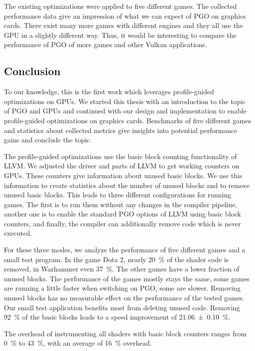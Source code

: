 The existing optimizations were applied to five different games.
The collected performance data give an impression of what we can expect of PGO on graphics cards.
There exist many more games with different engines and they all use the GPU in a slightly different way.
Thus, it would be interesting to compare the performance of PGO of more games and other Vulkan applications.

\subsection{Conclusion}
\label{sub:conclusion}
To our knowledge, this is the first work which leverages profile-guided optimizations on GPUs.
We started this thesis with an introduction to the topic of PGO and GPUs and continued with our design and implementation to enable profile-guided optimizations on graphics cards.
Benchmarks of five different games and statistics about collected metrics give insights into potential performance gains and conclude the topic.

The profile-guided optimizations use the basic block counting functionality of LLVM. We adjusted the driver and parts of LLVM to get working counters on GPUs.
These counters give information about unused basic blocks.
We use this information to create statistics about the number of unused blocks and to remove unused basic blocks.
This leads to three different configurations for running games.
The first is to run them without any changes in the compiler pipeline, another one is to enable the standard PGO options of LLVM using basic block counters, and finally, the compiler can additionally remove code which is never executed.

For these three modes, we analyze the performance of five different games and a small test program.
In the game Dota 2, nearly \SI{20}{\percent} of the shader code is removed, in Warhammer even \SI{37}{\percent}.
The other games have a lower fraction of unused blocks.
The performance of the games mostly stays the same, some games are running a little faster when switching on PGO, some are slower.
Removing unused blocks has no measurable effect on the performance of the tested games.
Our small test application benefits most from deleting unused code.
Removing \SI{92}{\percent} of the basic blocks leads to a speed improvement of \SI{21.06 \pm 0.10}{\percent}.

The overhead of instrumenting all shaders with basic block counters ranges from \SI{0}{\percent} to \SI{43}{\percent}, with an average of \SI{16}{\percent} overhead.

